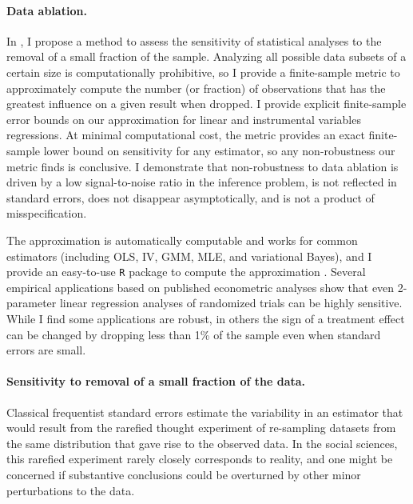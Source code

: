 \paragraph{Data ablation.}

In \citet{giordano:2020:amip}, I propose a method to assess the sensitivity of
statistical analyses to the removal of a small fraction of the sample. Analyzing
all possible data subsets of a certain size is computationally prohibitive, so I
provide a finite-sample metric to approximately compute the number (or fraction)
of observations that has the greatest influence on a given result when dropped.
I provide explicit finite-sample error bounds on our approximation for linear
and instrumental variables regressions. At minimal computational cost, the
metric provides an exact finite-sample lower bound on sensitivity for any
estimator, so any non-robustness our metric finds is conclusive. I demonstrate
that non-robustness to data ablation is driven by a low signal-to-noise ratio in
the inference problem, is not reflected in standard errors, does not disappear
asymptotically, and is not a product of misspecification.

The approximation is automatically computable and works for common estimators
(including OLS, IV, GMM, MLE, and variational Bayes), and I provide an
easy-to-use \texttt{R} package to compute the approximation
\citep{zaminfluence}. Several empirical applications based on published
econometric analyses \citep{angelucci:2009:indirect, finkelstein:2012:oregon,
meager:2019:microcredit} show that even 2-parameter linear regression analyses
of randomized trials can be highly sensitive. While I find some applications are
robust, in others the sign of a treatment effect can be changed by dropping less
than 1\% of the sample even when standard errors are small.


\newpage

\paragraph{Sensitivity to removal of a small fraction of the data.} Classical
frequentist standard errors estimate the variability in an estimator that would
result from the rarefied thought experiment of re-sampling datasets from the same
distribution that gave rise to the observed data.  In the social sciences, this
rarefied experiment rarely closely corresponds to reality, and one might be
concerned if substantive conclusions could be overturned by other minor
perturbations to the data.

